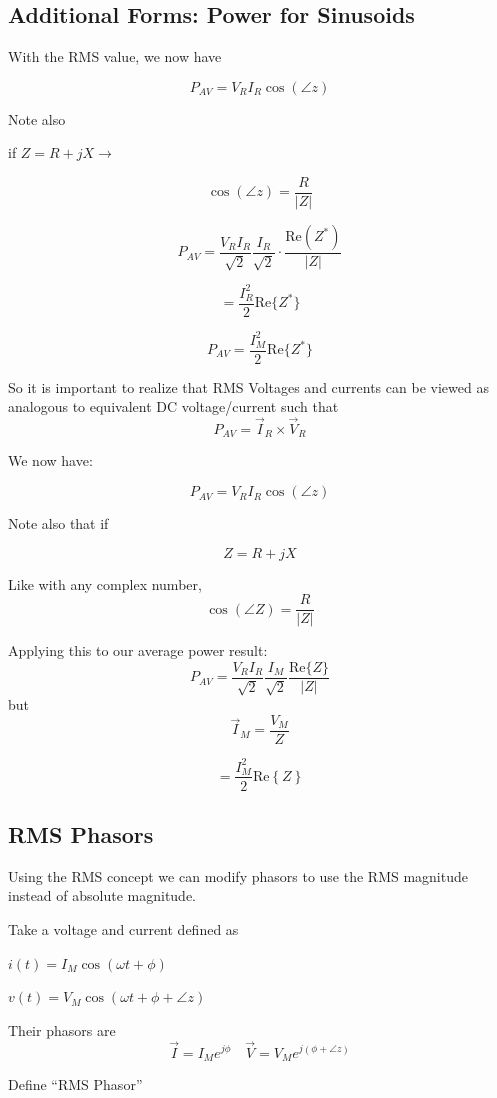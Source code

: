 \subsection{Additional Forms:  Power for Sinusoids}
With the RMS value, we now have

\[
P_{AV} = V_R I_R \cos(\angle z)
\]

\noindent Note also

if $Z = R + jX \rightarrow$


\[
\cos(\angle z) = \frac{R}{|Z|}
\]

\[
P_{AV} = \frac{V_R I_R}{\sqrt{2}} \frac{I_R}{\sqrt{2}} \cdot \frac{\text{Re}(Z^*)}{|Z|}
\]

\[
= \frac{I_R^2}{2} \text{Re}\{Z^*\}
\]

\[
P_{AV} = \frac{I_M^2}{2} \text{Re}\{Z^*\}
\]

So it is important to realize that  RMS Voltages and currents can
be viewed as analogous to
equivalent DC voltage/current such that
\[
P_{AV} = \vec I_R\times \vec V_R
\]


 We now have:

\[
P_{AV} = V_R I_R \cos(\angle z)
\]

  Note also that if

\[
Z = R + jX
\]

Like with any complex number,
\[
\cos(\angle Z) = \frac{R}{|Z|}
\]

Applying this to our average power result:
\[
P_{AV} = \frac{V_R I_R}{\sqrt{2}} \frac{I_M}{\sqrt{2}}  \frac{\mathrm{Re}\{Z\} }{|Z|}
\]
but
\[
\vec{I}_M = \frac{V_M}{Z}
\]

\[
= \frac{I_M^2}{2} \mathrm{Re}\left\{{Z}\right\}
\]



\subsection{RMS Phasors}   Using the RMS concept we can modify phasors to use
the RMS magnitude instead of absolute magnitude.

Take a voltage and current defined as

$i(t) = I_M \cos(\omega t + \phi)$

$v(t) = V_M \cos(\omega t + \phi + \angle z)$

Their phasors are
\[
\vec{I} = I_M e^{j\phi} \quad \vec{V} = V_M e^{j(\phi + \angle z)}
\]

\noindent Define ``RMS Phasor''


